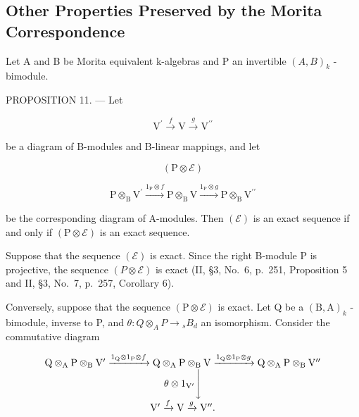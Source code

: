 \subsection{Other Properties Preserved by the Morita Correspondence}

Let A and B be Morita equivalent k-algebras and P an invertible \((A,B)_{k}\) -bimodule.

PROPOSITION 11. --- Let

\[
\mathrm{V} ^ {\prime} \xrightarrow {f} \mathrm{V} \xrightarrow {g} \mathrm{V} ^ {\prime \prime}\tag{ε}
\]

be a diagram of B-modules and B-linear mappings, and let

\[
(\mathrm{P} \otimes \mathcal {E})
\]

\[
\mathrm{P} \otimes_ {\mathrm{B}} \mathrm{V} ^ {\prime} \xrightarrow {1 _ {\mathrm{P}} \otimes f} \mathrm{P} \otimes_ {\mathrm{B}} \mathrm{V} \xrightarrow {1 _ {\mathrm{P}} \otimes g} \mathrm{P} \otimes_ {\mathrm{B}} \mathrm{V} ^ {\prime \prime}
\]

be the corresponding diagram of A-modules. Then \((\mathcal{E})\) is an exact sequence if and only if \((\mathrm{P} \otimes \mathcal{E})\) is an exact sequence.

Suppose that the sequence \((\mathcal{E})\) is exact. Since the right B-module P is projective, the sequence \((P \otimes \mathcal{E})\) is exact (II, §3, No.~6, p.~251, Proposition 5 and II, §3, No.~7, p.~257, Corollary 6).

Conversely, suppose that the sequence \((\mathrm{P} \otimes \mathcal{E})\) is exact. Let Q be a \((\mathrm{B}, \mathrm{A})_{k}\) -bimodule, inverse to P, and \(\theta : Q \otimes_{A} P \to {}_{s} B_{d}\) an isomorphism. Consider the commutative diagram

\[
\begin{array}{c} \mathrm{Q} \otimes_ {\mathrm{A}} \mathrm{P} \otimes_ {\mathrm{B}} \mathrm{V} ^ {\prime} \xrightarrow {1 _ {\mathrm{Q}} \otimes 1 _ {\mathrm{P}} \otimes f} \mathrm{Q} \otimes_ {\mathrm{A}} \mathrm{P} \otimes_ {\mathrm{B}} \mathrm{V} \xrightarrow {1 _ {\mathrm{Q}} \otimes 1 _ {\mathrm{P}} \otimes g} \mathrm{Q} \otimes_ {\mathrm{A}} \mathrm{P} \otimes_ {\mathrm{B}} \mathrm{V} ^ {\prime \prime} \\ \theta \otimes 1 _ {\mathrm{V} ^ {\prime}} \Biggl \downarrow \\ \mathrm{V} ^ {\prime} \xrightarrow {f} \mathrm{V} \xrightarrow {g} \mathrm{V} ^ {\prime \prime}. \end{array}
\]

